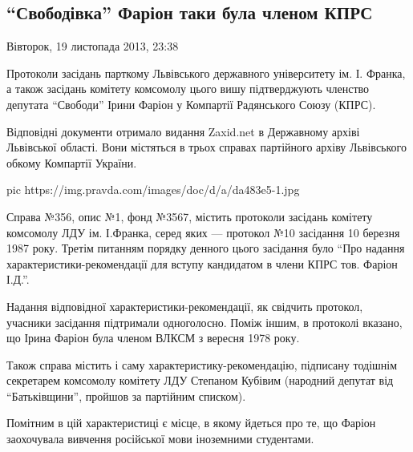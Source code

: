  
 
 
 
 
 
\subsection{\enquote{Свободівка} Фаріон таки була членом КПРС}
\label{sec:19_11_2013.news.ua.pravda.1.farion_kpss}

Вівторок, 19 листопада 2013, 23:38

Протоколи засідань парткому Львівського державного університету ім. І. Франка,
а також засідань комітету комсомолу цього вишу підтверджують членство депутата
\enquote{Свободи} Ірини Фаріон у Компартії Радянського Союзу (КПРС).

Відповідні документи отримало видання Zaxid.net в Державному архіві Львівської
області. Вони містяться в трьох справах партійного архіву Львівського обкому
Компартії України.

\ifcmt
pic https://img.pravda.com/images/doc/d/a/da483e5-1.jpg
\fi

Справа №356, опис №1, фонд №3567, містить протоколи засідань комітету комсомолу
ЛДУ ім. І.Франка, серед яких --- протокол №10 засідання 10 березня 1987 року.
Третім питанням порядку денного цього засідання було \enquote{Про надання
характеристики-рекомендації для вступу кандидатом в члени КПРС тов. Фаріон
І.Д.}.

Надання відповідної характеристики-рекомендації, як свідчить протокол, учасники
засідання підтримали одноголосно. Поміж іншим, в протоколі вказано, що Ірина
Фаріон була членом ВЛКСМ з вересня 1978 року.

Також справа містить і саму характеристику-рекомендацію, підписану тодішнім
секретарем комсомолу комітету ЛДУ Степаном Кубівим (народний депутат від
\enquote{Батьківщини}, пройшов за партійним списком).

Помітним в цій характеристиці є місце, в якому йдеться про те, що Фаріон
заохочувала вивчення російської мови іноземними студентами.

